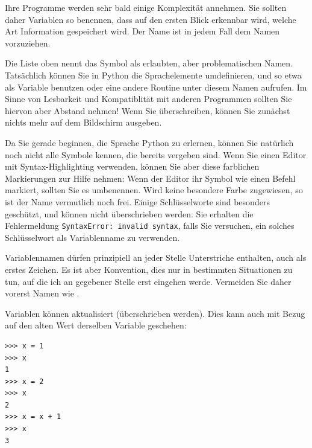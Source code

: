\begin{hintbox}
Ihre Programme werden sehr bald einige Komplexität annehmen. Sie sollten daher Variablen so benennen, dass auf den ersten Blick erkennbar wird, welche Art Information gespeichert wird. Der Name  ist in jedem Fall dem Namen  vorzuziehen.
\end{hintbox}
%
\begin{hintbox}[]
Die Liste oben nennt das Symbol  als erlaubten, aber problematischen Namen. Tatsächlich können Sie in Python die Sprachelemente umdefinieren, und so etwa  als Variable benutzen oder eine andere Routine unter diesem Namen aufrufen. Im Sinne von Lesbarkeit und Kompatiblität mit anderen Programmen sollten Sie hiervon aber Abstand nehmen! Wenn Sie  überschreiben, können Sie zunächst nichts mehr auf dem Bildschirm ausgeben.

Da Sie gerade beginnen, die Sprache Python zu erlernen, können Sie natürlich noch nicht alle Symbole kennen, die bereits vergeben sind. Wenn Sie einen Editor mit Syntax-Highlighting verwenden, können Sie aber \idR diese farblichen Markierungen zur Hilfe nehmen: Wenn der Editor ihr Symbol wie einen Befehl markiert, sollten Sie es umbenennen. Wird keine besondere Farbe zugewiesen, so ist der Name vermutlich noch frei. Einige Schlüsselworte sind besonders geschützt, und können nicht überschrieben werden. Sie erhalten die Fehlermeldung \texttt{SyntaxError: invalid syntax}, falls Sie versuchen, ein solches Schlüsselwort als Variablenname zu verwenden.
\end{hintbox}

\begin{hintbox}
Variablennamen dürfen prinzipiell an jeder Stelle Unterstriche enthalten, auch als erstes Zeichen. Es ist aber Konvention, dies nur in bestimmten Situationen zu tun, auf die ich an gegebener Stelle erst eingehen werde. Vermeiden Sie daher vorerst Namen wie .
\end{hintbox}

Variablen können aktualisiert (\ie überschrieben werden). Dies kann auch mit Bezug auf den alten Wert derselben Variable geschehen:
\begin{cmdbox}
\begin{verbatim}
>>> x = 1
>>> x
1
>>> x = 2
>>> x
2
>>> x = x + 1
>>> x
3
\end{verbatim}
\end{cmdbox}

